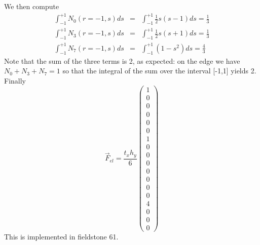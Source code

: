We then compute
\begin{eqnarray}
\int_{-1}^{+1} N_0(r=-1,s) ds 
&=& \int_{-1}^{+1} \frac{1}{2}s(s-1) ds = \frac{1}{3} \\
\int_{-1}^{+1} N_3(r=-1,s) ds 
&=& \int_{-1}^{+1} \frac{1}{2}s(s+1) ds = \frac{1}{3} \\
\int_{-1}^{+1} N_7(r=-1,s) ds 
&=& \int_{-1}^{+1} (1-s^2) ds = \frac{4}{3} 
\end{eqnarray}
Note that the sum of the three terms is 2, as expected: on the edge
we have $N_0+N_3+N_7 =1$ so that the integral of the sum over the 
interval [-1,1] yields 2. Finally 
\[
\vec{F}_{el}
=
\frac{t_x  h_y}{6}
\left(
\begin{array}{c}
1 \\
0 \\
0 \\
0 \\
0 \\
0 \\
1 \\
0 \\
0 \\
0 \\
0 \\
0 \\
0 \\
0 \\
4 \\
0 \\
0 \\
0
\end{array}
\right)
\]
This is implemented in fieldstone 61.









